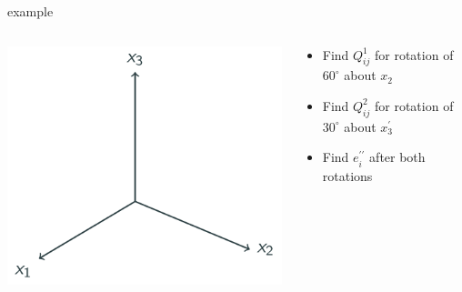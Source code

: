 \documentclass[
  letterpaper,
  ignorenonframetext,
  aspectratio=43,
  handout,
  12pt]{beamer}
\providecommand{\tightlist}{%
  \setlength{\itemsep}{0pt}\setlength{\parskip}{0pt}}
\providecommand{\tightlist}{%
\setlength{\itemsep}{0pt}\setlength{\parskip}{0pt}}
\let\Oldincludegraphics\includegraphics
\renewcommand{\includegraphics}[2][]{\Oldincludegraphics[width=\textwidth,height=0.7\textheight,keepaspectratio]{#2}}
\begin{document}
\begin{frame}{example}
\protect\hypertarget{example}{}
\begin{columns}[T]
\begin{column}{0.5\textwidth}
\includegraphics{../images/3d-axis.svg}
\end{column}

\begin{column}{0.5\textwidth}
\begin{itemize}
\tightlist
\item
  Find \(Q_{ij}^1\) for rotation of \(60^\circ\) about \(x_2\)
\item
  Find \(Q_{ij}^2\) for rotation of \(30^\circ\) about \(x_3^\prime\)
\item
  Find \(e_{i}^{\prime\prime}\) after both rotations
\end{itemize}
\end{column}
\end{columns}
\end{frame}
\end{document}
